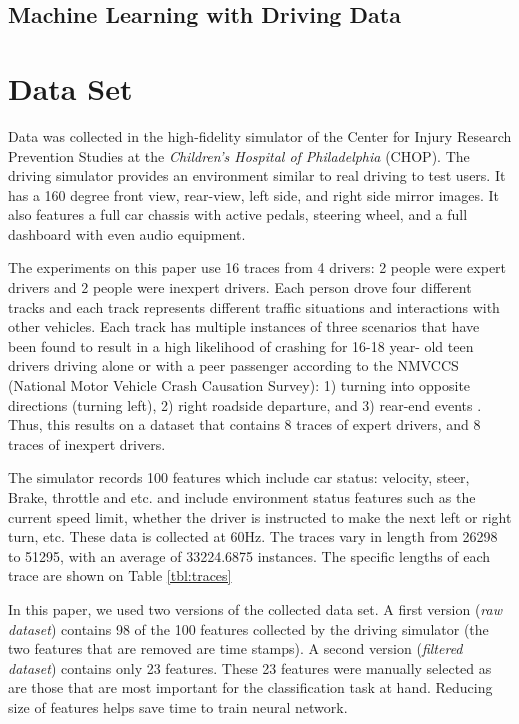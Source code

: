 \documentclass[draft,dvipsnames]{drexel-thesis}
\begin{document}
\begin{thesis}
\section{Machine Learning with Driving Data}\label{sec:MLDD}

\chapter{Data Set}

Data was collected in the high-fidelity simulator \cite{lee2017learning} of the Center for Injury Research Prevention Studies at the \textit{Children's Hospital of Philadelphia} (CHOP). The driving simulator provides an environment similar to real driving to test users. It has a 160 degree front view, rear-view, left side, and right side mirror images. It also features a full car chassis with active pedals, steering wheel, and a full dashboard with even audio equipment.

The experiments on this paper use 16 traces from 4 drivers: 2 people were expert drivers and 2 people were inexpert drivers. Each person drove four different tracks and each track represents different traffic situations and interactions with other vehicles. Each track has multiple instances of three scenarios that have been found to result in a high likelihood of crashing for 16-18 year- old teen drivers driving alone or with a peer passenger according to the NMVCCS (National Motor Vehicle Crash Causation Survey): 1) turning into opposite directions (turning left), 2) right roadside departure, and 3) rear-end events \cite{mcdonald2012using}. Thus, this results on a dataset that contains 8 traces of expert drivers, and 8 traces of inexpert drivers.

The simulator records 100 features which include car status: velocity, steer, Brake, throttle and etc. and include environment status features such as the current speed limit, whether the driver is instructed to make the next left or right turn, etc. These data is collected at 60Hz. The traces vary in length from 26298 to 51295, with an average of 33224.6875 instances. The specific lengths of each trace are shown on Table \ref{tbl:traces}

In this paper, we used two versions of the collected data set. A first version ({\em raw dataset}) contains 98 of the 100 features collected by the driving simulator (the two features that are removed are time stamps). A second version ({\em filtered dataset}) contains only 23 features. These 23 features were manually selected as are those that are most important for the classification task at hand. Reducing size of features helps save time to train neural network.


\end{thesis}
\end{document}
